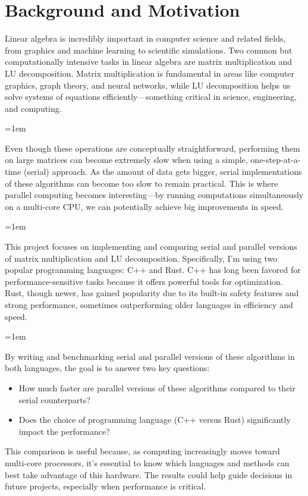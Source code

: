 \documentclass[12pt]{article}
\begin{document}
\section{Background and Motivation}
Linear algebra is incredibly important in computer science and related fields, from graphics and machine learning to scientific simulations.
Two common but computationally intensive tasks in linear algebra are matrix multiplication and LU decomposition. Matrix multiplication is fundamental
in areas like computer graphics, graph theory, and neural networks, while LU decomposition helps us solve systems of equations
efficiently---something critical in science, engineering, and computing.

\parskip=1em

Even though these operations are conceptually straightforward, performing them on large matrices can become extremely slow when using a simple,
one-step-at-a-time (serial) approach. As the amount of data gets bigger, serial implementations of these algorithms can become too slow to remain practical. This is
where parallel computing becomes interesting---by running computations simultaneously on a multi-core CPU, we can potentially
achieve big improvements in speed.

\parskip=1em

This project focuses on implementing and comparing serial and parallel versions of matrix multiplication and LU decomposition. Specifically,
I'm using two popular programming languages: C++ and Rust. C++ has long been favored for performance-sensitive tasks because it offers powerful
tools for optimization. Rust, though newer, has gained popularity due to its built-in safety features and strong performance, sometimes outperforming
older languages in efficiency and speed.

\parskip=1em

By writing and benchmarking serial and parallel versions of these algorithms in both languages, the goal is to answer two key questions:

\begin{itemize}
    \item How much faster are parallel versions of these algorithms compared to their serial counterparts?
    \item Does the choice of programming language (C++ versus Rust) significantly impact the performance?
\end{itemize}

This comparison is useful because, as computing increasingly moves toward multi-core processors, it's essential to know which languages and methods can
best take advantage of this hardware. The results could help guide decisions in future projects, especially when performance is critical.
\end{document}
